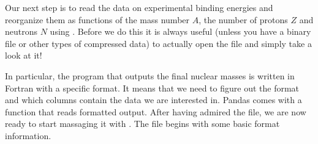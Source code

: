 \documentclass[letterpaper,10pt,english]{sphinxmanual}
\begin{document}
Our next step is to read the data on experimental binding energies and
reorganize them as functions of the mass number \(A\), the number of
protons \(Z\) and neutrons \(N\) using .  Before we do this it is
always useful (unless you have a binary file or other types of compressed
data) to actually open the file and simply take a look at it!

In particular, the program that outputs the final nuclear masses is written in Fortran with a specific format. It means that we need to figure out the format and which columns contain the data we are interested in. Pandas comes with a function that reads formatted output. After having admired the file, we are now ready to start massaging it with . The file begins with some basic format information.

\begin{sphinxVerbatim}[commandchars=\\\{\}]
\end{sphinxVerbatim}
\end{document}
